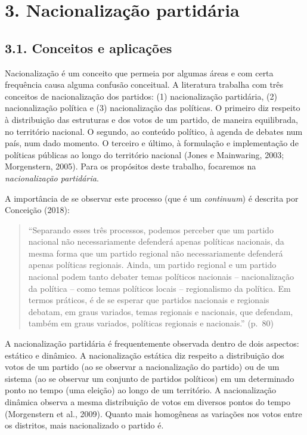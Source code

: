 \documentclass[]{article}
\begin{document}
\section{3. Nacionalização partidária}\label{nacionalizacao-partidaria}

\subsection{3.1. Conceitos e aplicações}\label{conceitos-e-aplicacoes}

Nacionalização é um conceito que permeia por algumas áreas e com certa
frequência causa alguma confusão conceitual. A literatura trabalha com
três conceitos de nacionalização dos partidos: (1) nacionalização
partidária, (2) nacionalização política e (3) nacionalização das
políticas. O primeiro diz respeito à distribuição das estruturas e dos
votos de um partido, de maneira equilibrada, no território nacional. O
segundo, ao conteúdo político, à agenda de debates num país, num dado
momento. O terceiro e último, à formulação e implementação de políticas
públicas ao longo do território nacional (Jones e Mainwaring, 2003;
Morgenstern, 2005). Para os propósitos deste trabalho, focaremos na
\emph{nacionalização partidária}.

A importância de se observar este processo (que é um \emph{continuum}) é
descrita por Conceição (2018):

\begin{quote}
``Separando esses três processos, podemos perceber que um partido
nacional não necessariamente defenderá apenas políticas nacionais, da
mesma forma que um partido regional não necessariamente defenderá apenas
políticas regionais. Ainda, um partido regional e um partido nacional
podem tanto debater temas políticos nacionais -- nacionalização da
política -- como temas políticos locais -- regionalismo da política. Em
termos práticos, é de se esperar que partidos nacionais e regionais
debatam, em graus variados, temas regionais e nacionais, que defendam,
também em graus variados, políticas regionais e nacionais.'' (p.~80)
\end{quote}

A nacionalização partidária é frequentemente observada dentro de dois
aspectos: estático e dinâmico. A nacionalização estática diz respeito a
distribuição dos votos de um partido (ao se observar a nacionalização do
partido) ou de um sistema (ao se observar um conjunto de partidos
políticos) em um determinado ponto no tempo (uma eleição) ao longo de um
território. A nacionalização dinâmica observa a mesma distribuição de
votos em diversos pontos do tempo (Morgenstern et al., 2009). Quanto
mais homogêneas as variações nos votos entre os distritos, mais
nacionalizado o partido é.
\end{document}
